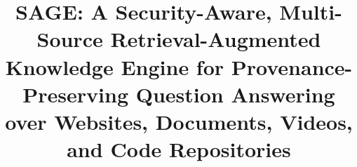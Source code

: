 \documentclass[conference]{IEEEtran}
\begin{document}
\title{SAGE: A Security-Aware, Multi-Source Retrieval-Augmented\\
Knowledge Engine for Provenance-Preserving Question Answering\\
over Websites, Documents, Videos, and Code Repositories}

\author{
}

\maketitle
\end{document}
